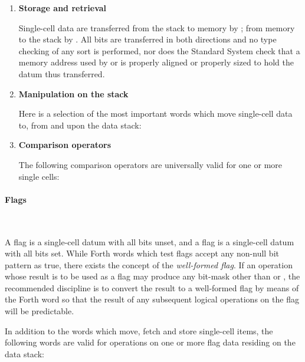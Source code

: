 \begin{enumerate}
\item \textbf{Storage and retrieval}

	Single-cell data are transferred from the stack to memory by
	\word{!}; from memory to the stack by . All bits are
	transferred in both directions and no type checking of any sort
	is performed, nor does the Standard System check that a memory
	address used by \word{!} or  is properly aligned or
	properly sized to hold the datum thus transferred.

\item \textbf{Manipulation on the stack}

	Here is a selection of the most important words which move
	single-cell data to, from and upon the data stack:

	\begin{quote}\ttfamily
		\word{!}			
					
					
	\end{quote}

\item \textbf{Comparison operators}

	The following comparison operators are universally valid for one
	or more single cells:

	\begin{quote}\ttfamily
		\word{=}			
	\end{quote}
\end{enumerate}


\paragraph{Flags} ~ %

A  flag is a single-cell datum with all bits unset, and
a  flag is a single-cell datum with all bits set. While
Forth words which test flags accept any non-null bit pattern as true,
there exists the concept of the \emph{well-formed flag}. If an
operation whose result is to be used as a flag may produce any
bit-mask other than  or , the recommended
discipline is to convert the result to a well-formed flag by means
of the Forth word  so that the result of any subsequent
logical operations on the flag will be predictable.

In addition to the words which move, fetch and store single-cell
items, the following words are valid for operations on one or more
flag data residing on the data stack:

